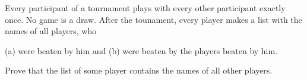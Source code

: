Every participant of a tournament plays with every other participant exactly once. No game is a draw. After the tounament, every player makes a list with the names of all players, who

(a) were beaten by him and (b) were beaten by the players beaten by him.

Prove that the list of some player contains the names of all other players.
